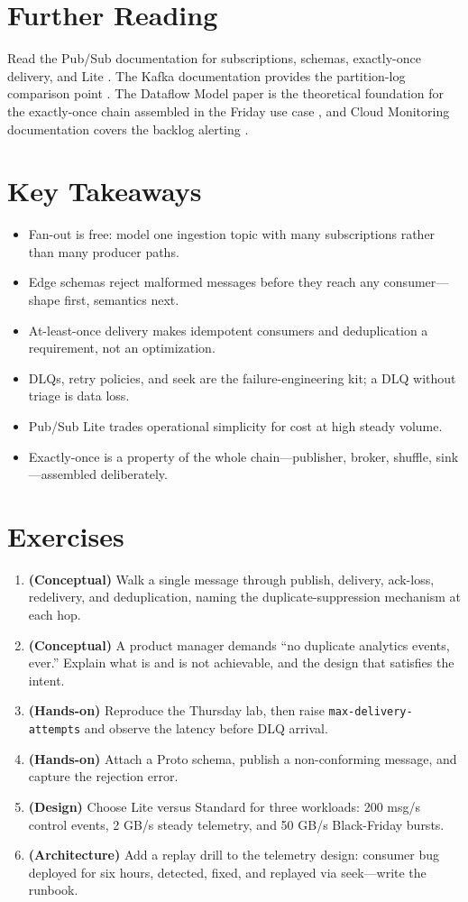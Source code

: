 \section{Further Reading}
Read the Pub/Sub documentation for subscriptions, schemas, exactly-once delivery, and Lite \cite{googlecloudpubsubdocs}. The Kafka documentation provides the partition-log comparison point \cite{apachekafkadocs}. The Dataflow Model paper is the theoretical foundation for the exactly-once chain assembled in the Friday use case \cite{akidau2015dataflow}, and Cloud Monitoring documentation covers the backlog alerting \cite{googlecloudmonitoringdocs}.

\section*{Key Takeaways}
\begin{itemize}
    \item Fan-out is free: model one ingestion topic with many subscriptions rather than many producer paths.
    \item Edge schemas reject malformed messages before they reach any consumer---shape first, semantics next.
    \item At-least-once delivery makes idempotent consumers and deduplication a requirement, not an optimization.
    \item DLQs, retry policies, and seek are the failure-engineering kit; a DLQ without triage is data loss.
    \item Pub/Sub Lite trades operational simplicity for cost at high steady volume.
    \item Exactly-once is a property of the whole chain---publisher, broker, shuffle, sink---assembled deliberately.
\end{itemize}

\section{Exercises}
\begin{enumerate}
    \item \textbf{(Conceptual)} Walk a single message through publish, delivery, ack-loss, redelivery, and deduplication, naming the duplicate-suppression mechanism at each hop.
    \item \textbf{(Conceptual)} A product manager demands ``no duplicate analytics events, ever.'' Explain what is and is not achievable, and the design that satisfies the intent.
    \item \textbf{(Hands-on)} Reproduce the Thursday lab, then raise \texttt{max-delivery-attempts} and observe the latency before DLQ arrival.
    \item \textbf{(Hands-on)} Attach a Proto schema, publish a non-conforming message, and capture the rejection error.
    \item \textbf{(Design)} Choose Lite versus Standard for three workloads: 200 msg/s control events, 2 GB/s steady telemetry, and 50 GB/s Black-Friday bursts.
    \item \textbf{(Architecture)} Add a replay drill to the telemetry design: consumer bug deployed for six hours, detected, fixed, and replayed via seek---write the runbook.
\end{enumerate}
